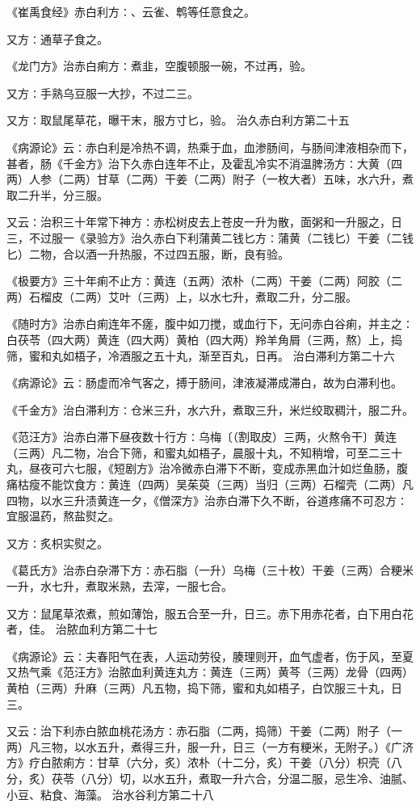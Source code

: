 \documentclass[a4paper,12pt,UTF8,twoside]{ctexbook}
\begin{document}
《崔禹食经》赤白利方∶、云雀、鹎等任意食之。

又方∶通草子食之。

《龙门方》治赤白痢方∶煮韭，空腹顿服一碗，不过再，验。

又方∶手熟乌豆服一大抄，不过二三。

又方∶取鼠尾草花，曝干末，服方寸匕，验。
治久赤白利方第二十五

《病源论》云∶赤白利是冷热不调，热乘于血，血渗肠间，与肠间津液相杂而下，甚者，肠《千金方》治下久赤白连年不止，及霍乱冷实不消温脾汤方∶大黄（四两）人参（二两）甘草（二两）干姜（二两）附子（一枚大者）五味，水六升，煮取二升半，分三服。

又云∶治积三十年常下神方∶赤松树皮去上苍皮一升为散，面粥和一升服之，日三，不过服一《录验方》治久赤白下利蒲黄二钱匕方∶蒲黄（二钱匕）干姜（二钱匕）二物，合以酒一升热服，不过四五服，断，良有验。

《极要方》三十年痢不止方∶黄连（五两）浓朴（二两）干姜（二两）阿胶（二两）石榴皮（二两）艾叶（三两）上，以水七升，煮取二升，分二服。

《随时方》治赤白痢连年不瘥，腹中如刀搅，或血行下，无问赤白谷痢，并主之∶白茯苓（四大两）黄连（四大两）黄柏（四大两）羚羊角屑（三两，熬）上，捣筛，蜜和丸如梧子，冷酒服之五十丸，渐至百丸，日再。
治白滞利方第二十六

《病源论》云∶肠虚而冷气客之，搏于肠间，津液凝滞成滞白，故为白滞利也。

《千金方》治白滞利方∶仓米三升，水六升，煮取三升，米烂绞取稠汁，服二升。

《范汪方》治赤白滞下昼夜数十行方∶乌梅〔（割取皮）三两，火熬令干〕黄连（三两）凡二物，冶合下筛，和蜜丸如梧子，晨服十丸，不知稍增，可至二三十丸，昼夜可六七服，《短剧方》治冷微赤白滞下不断，变成赤黑血汁如烂鱼肠，腹痛枯瘦不能饮食方∶黄连（四两）吴茱萸（三两）当归（三两）石榴壳（二两）凡四物，以水三升渍黄连一夕，《僧深方》治赤白滞下久不断，谷道疼痛不可忍方∶宜服温药，熬盐熨之。

又方∶炙枳实熨之。

《葛氏方》治赤白杂滞下方∶赤石脂（一升）乌梅（三十枚）干姜（三两）合粳米一升，水七升，煮取米熟，去滓，一服七合。

又方∶鼠尾草浓煮，煎如薄饴，服五合至一升，日三。赤下用赤花者，白下用白花者，佳。
治脓血利方第二十七

《病源论》云∶夫春阳气在表，人运动劳役，腠理则开，血气虚者，伤于风，至夏又热气乘《范汪方》治脓血利黄连丸方∶黄连（三两）黄芩（三两）龙骨（四两）黄柏（三两）升麻（三两）凡五物，捣下筛，蜜和丸如梧子，白饮服三十丸，日三。

又云∶治下利赤白脓血桃花汤方∶赤石脂（二两，捣筛）干姜（二两）附子（一两）凡三物，以水五升，煮得三升，服一升，日三（一方有粳米，无附子。）《广济方》疗白脓痢方∶甘草（六分，炙）浓朴（十二分，炙）干姜（八分）枳壳（八分，炙）茯苓（八分）切，以水五升，煮取一升六合，分温二服，忌生冷、油腻、小豆、粘食、海藻。
治水谷利方第二十八
\end{document}
